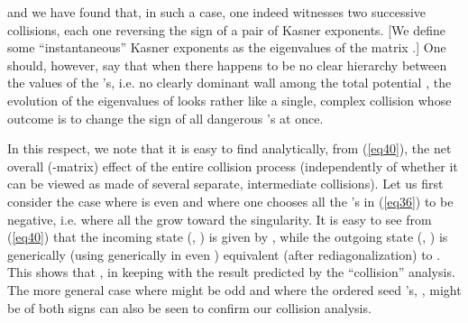 \documentclass[a4paper,12pt]{article}
\begin{document}
and we have found that, in such a case, one indeed witnesses two 
successive collisions, each one reversing the sign of a pair of Kasner 
exponents. [We define some ``instantaneous'' Kasner exponents as the
eigenvalues of the matrix  \coordHE{}.]  One
should, however, say that when there happens to be no clear hierarchy 
between the values of the \myHighlight{$\alpha$}\coordHE{}'s, i.e. no clearly dominant wall 
among the total potential \coordHE{}, the evolution of the 
eigenvalues of \coordHE{} looks rather like a single, complex 
collision whose outcome is to change the sign of all dangerous 
\myHighlight{$\alpha$}\coordHE{}'s at once. 

In this respect, we note that it is easy to find 
analytically, from (\ref{eq40}), the net overall (\coordHE{}-matrix) effect of 
the entire collision process (independently of whether it can be viewed 
as made of several separate, intermediate collisions). Let us first 
consider the case where \coordHE{} is even and where one chooses all the 
\myHighlight{$\alpha$}\coordHE{}'s in (\ref{eq36}) to be negative, i.e. where all the \coordHE{} grow toward the singularity. It is easy to 
see from (\ref{eq40}) that the incoming state (\coordHE{}, \myHighlight{$\overline \tau \rightarrow + \infty$}\coordHE{}) is given by 
\coordHE{}, 
while the outgoing state (\coordHE{}, \myHighlight{$\overline \tau 
\rightarrow - \infty$}\coordHE{}) is generically (using \coordHE{} generically 
in even \coordHE{}) equivalent (after rediagonalization) to \coordHE{}. This shows that 
\coordHE{}, in keeping with the result 
predicted by the ``collision'' analysis. The more general case where \coordHE{} 
might be odd and where the ordered seed \myHighlight{$\alpha$}\coordHE{}'s, \coordHE{}, might be of both signs can also be seen to 
confirm our collision analysis. 
\end{document}
